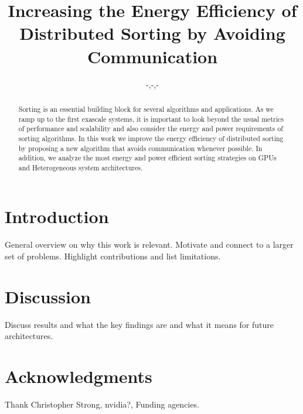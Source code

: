 \documentclass{sig-alternate}
\begin{document}
%

\title{Increasing the Energy Efficiency of Distributed Sorting by Avoiding Communication}


\author{
  -,-,-
}

\maketitle
\begin{abstract}
Sorting is an essential building block for several algorithms and applications. As we ramp up to the first exascale systems, it is important to look beyond the usual metrics of performance and scalability and also consider the energy and power requirements of sorting algorithms. 
In this work we improve the energy efficiency of distributed sorting by proposing a new algorithm that avoids communication whenever possible. In addition, we analyze the most energy and power efficient sorting strategies on GPUs and Heterogeneous system architectures.
\end{abstract}




\section{Introduction}
General overview on why this work is relevant. Motivate and connect to a larger set of problems. Highlight contributions and list limitations.











\section{Discussion}
Discuss results and what the key findings are and what it means for future architectures.


\section{Acknowledgments}
Thank Christopher Strong, nvidia?, Funding agencies.


%

 

\end{document}
